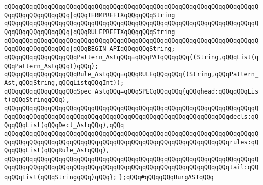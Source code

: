 \verb|qQQqqQQqqQQqqQQqqQQqqQQqqQQqqQQqqQQqqQQqqQQqqQQqqQQqqQQqqQQqqQQqqQQqqQQqqQQqqQQqqQQqqQQq|\verb#|qQQqTERMPREFIXqQQqqQQqString#\newline
\verb|qQQqqQQqqQQqqQQqqQQqqQQqqQQqqQQqqQQqqQQqqQQqqQQqqQQqqQQqqQQqqQQqqQQqqQQqqQQqqQQqqQQqqQQq|\verb#|qQQqRULEPREFIXqQQqqQQqString#\newline
\verb|qQQqqQQqqQQqqQQqqQQqqQQqqQQqqQQqqQQqqQQqqQQqqQQqqQQqqQQqqQQqqQQqqQQqqQQqqQQqqQQqqQQqqQQq|\verb#|qQQqBEGIN_APIqQQqqQQqString;#\newline
\newline
\verb|qQQqqQQqqQQqqQQqqQQqPattern_AstqQQq=qQQqPATqQQqqQQq((String,qQQqList(qQQqPattern_AstqQQq))qQQq);|\newline
\newline
\verb|qQQqqQQqqQQqqQQqqQQqRule_AstqQQq=qQQqRULEqQQqqQQq((String,qQQqPattern_Ast,qQQqString,qQQqListqQQqInt));|\newline
\newline
\verb|qQQqqQQqqQQqqQQqqQQqSpec_AstqQQq=qQQqSPECqQQqqQQq{qQQqhead:qQQqqQQqList(qQQqStringqQQq),|\newline
\verb|qQQqqQQqqQQqqQQqqQQqqQQqqQQqqQQqqQQqqQQqqQQqqQQqqQQqqQQqqQQqqQQqqQQqqQQqqQQqqQQqqQQqqQQqqQQqqQQqqQQqqQQqqQQqqQQqqQQqqQQqqQQqqQQqqQQqdecls:qQQqqQQqList(qQQqDecl_AstqQQq),qQQq|\newline
\verb|qQQqqQQqqQQqqQQqqQQqqQQqqQQqqQQqqQQqqQQqqQQqqQQqqQQqqQQqqQQqqQQqqQQqqQQqqQQqqQQqqQQqqQQqqQQqqQQqqQQqqQQqqQQqqQQqqQQqqQQqqQQqqQQqqQQqrules:qQQqqQQqList(qQQqRule_AstqQQq),|\newline
\verb|qQQqqQQqqQQqqQQqqQQqqQQqqQQqqQQqqQQqqQQqqQQqqQQqqQQqqQQqqQQqqQQqqQQqqQQqqQQqqQQqqQQqqQQqqQQqqQQqqQQqqQQqqQQqqQQqqQQqqQQqqQQqqQQqqQQqtail:qQQqqQQqList(qQQqStringqQQq)qQQq};|\newline
\verb|};qQQq#qQQqqQQqBurgASTqQQq|\newline
\newline

